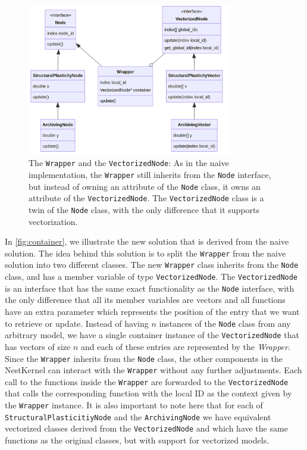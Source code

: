 \begin{figure}[h!]
\centering
\includegraphics[width=0.8\textwidth]{src/pic/wrapper_node.png}
\caption{The \texttt{Wrapper} and the \texttt{VectorizedNode}: As in the naive implementation, the \texttt{Wrapper} still inherits from the \texttt{Node} interface, but instead of owning an attribute of the \texttt{Node} class, it owns an attribute of the \texttt{VectorizedNode}. The \texttt{VectorizedNode} class is a twin of the \texttt{Node} class, with the only difference that it supports vectorization.}
\label{fig:container}
\end{figure}

In \autoref{fig:container}, we illustrate the new solution that is derived from the naive solution. The idea behind this solution is to split the \texttt{Wrapper} from the naive solution into two different classes. The new \texttt{Wrapper} class inherits from the \texttt{Node} class, and has a member variable of type \texttt{VectorizedNode}. The \texttt{VectorizedNode} is an interface that has the same exact functionality as the \texttt{Node} interface, with the only difference that all its member variables are vectors and all functions have an extra parameter which represents the position of the entry that we want to retrieve or update. Instead of having $n$ instances of the \texttt{Node} class from any arbitrary model, we have a single container instance of the \texttt{VectorizedNode} that has vectors of size $n$ and each of these entries are represented by the \emph{Wrapper}. Since the \texttt{Wrapper} inherits from the \texttt{Node} class, the other components in the NestKernel can interact with the \texttt{Wrapper} without any further adjustments. Each call to the functions inside the \texttt{Wrapper} are forwarded to the \texttt{VectorizedNode} that calls the corresponding function with the local ID as the context given by the \texttt{Wrapper} instance. It is also important to note here that for each of \texttt{StructuralPlasticitiyNode} and the \texttt{ArchivingNode} we have equivalent vectorized classes derived from the \texttt{VectorizedNode} and which have the same functions as the original classes, but with support for vectorized models.

